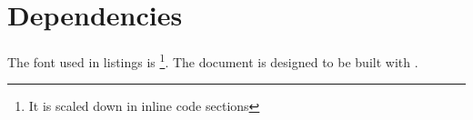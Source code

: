 \section{Dependencies}

The font used in listings is \footnote{It is scaled down in inline code sections}.
The document is designed to be built with .


